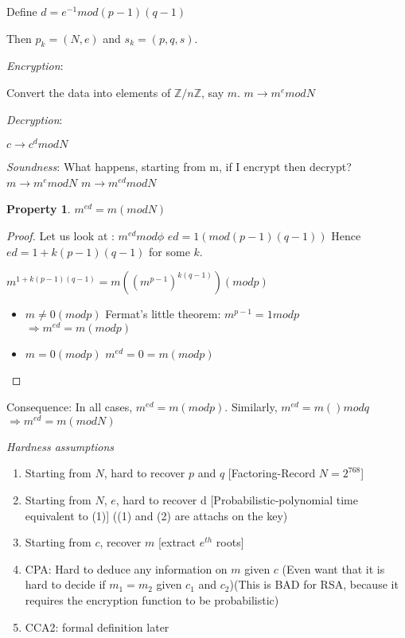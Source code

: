 \documentclass[a4paper,10pt]{article}
\newtheorem{proposition}{Property}
\begin{document}
Define $d=e^{-1} mod (p-1)(q-1)$

Then $p_k=(N,e)$ and $s_k=(p,q,s)$.

\textit{Encryption}:

Convert the data into elements of $\mathbb{Z}/ n \mathbb{Z}$, say $m$.
$m \rightarrow m^e mod N$

\textit{Decryption}:

$c \rightarrow c^d mod N$

\textit{Soundness}:
What happens, starting from m, if I encrypt then decrypt?
$m \rightarrow m^e mod N$
$m \rightarrow m^{e d} mod N$

\begin{proposition}
$m^{e d} = m (mod N)$
\end{proposition}

\begin{proof}
Let us look at :
$m^{e d} mod \phi$
$ed = 1 (mod (p-1)(q-1))$
Hence
$ed=1+k(p-1)(q-1)$ for some $k$.

$m^{1+k(p-1)(q-1)}= m ((m^{p-1})^{k(q-1)}) (mod p)$

\begin{itemize}
\item $m \neq 0 (mod p)$
Fermat's little theorem: $m^{p-1}=1 mod p$
$\Rightarrow m^{e d}=m (mod p)$
\item $m=0 (mod p)$
$m^{e d}=0=m (mod p)$
\end{itemize}
\end{proof}

Consequence: In all cases, $m^{e d}= m(mod p)$. Similarly, $m^{e d}=m ()mod q$
$\Rightarrow m^{e d}=m(mod N)$

\textit{Hardness assumptions}

\begin{enumerate}
\item Starting from $N$, hard to recover $p$ and $q$ [Factoring-Record $N = 2^{768}$]
\item Starting from $N$, $e$, hard to recover d [Probabilistic-polynomial time equivalent to (1)] ((1) and (2) are attachs on the key)
\item Starting from $c$, recover $m$ [extract $e^{th}$ roots]
\item CPA: Hard to deduce any information on $m$ given $c$ (Even want that it is hard to decide if $m_1=m_2$ given $c_1$ and $c_2$)(This is BAD for RSA, because it requires the encryption function to be probabilistic)
\item CCA2: formal definition later
\end{enumerate}
\end{document}
